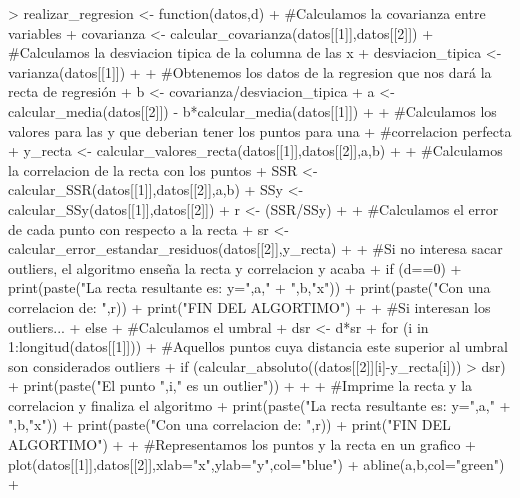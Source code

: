 \documentclass[parskip=full]{scrartcl}
\begin{document}
\begin{Schunk}
\begin{Sinput}
> realizar_regresion <- function(datos,d){
+ #Calculamos la covarianza entre variables
+ covarianza <- calcular_covarianza(datos[[1]],datos[[2]])
+ #Calculamos la desviacion tipica de la columna de las x
+ desviacion_tipica <- varianza(datos[[1]])
+ 
+ #Obtenemos los datos de la regresion que nos dará la recta de regresión
+ b <- covarianza/desviacion_tipica
+ a <- calcular_media(datos[[2]]) - b*calcular_media(datos[[1]])
+ 
+ #Calculamos los valores para las y que deberian tener los puntos para una 
+ #correlacion perfecta
+ y_recta <- calcular_valores_recta(datos[[1]],datos[[2]],a,b)
+ 
+ #Calculamos la correlacion de la recta con los puntos
+ SSR <- calcular_SSR(datos[[1]],datos[[2]],a,b)
+ SSy <- calcular_SSy(datos[[1]],datos[[2]])
+ r <- (SSR/SSy)
+ 
+ #Calculamos el error de cada punto con respecto a la recta
+ sr <- calcular_error_estandar_residuos(datos[[2]],y_recta)
+ 
+ #Si no interesa sacar outliers, el algoritmo enseña la recta y correlacion y acaba
+ if (d==0){
+ print(paste("La recta resultante es: y=",a," + ",b,"x"))
+ print(paste("Con una correlacion de: ",r))
+ print("FIN DEL ALGORTIMO")
+ }
+ #Si interesan los outliers...
+ else{
+ #Calculamos el umbral
+ dsr <- d*sr
+ for (i in 1:longitud(datos[[1]])){
+   #Aquellos puntos cuya distancia este superior al umbral son considerados outliers
+   if (calcular_absoluto((datos[[2]][i]-y_recta[i])) > dsr){
+     print(paste("El punto ",i," es un outlier"))
+   }
+ }
+ #Imprime la recta y la correlacion y finaliza el algoritmo
+ print(paste("La recta resultante es: y=",a," + ",b,"x"))
+ print(paste("Con una correlacion de: ",r))
+ print("FIN DEL ALGORTIMO")
+ }
+ #Representamos los puntos y la recta en un grafico
+ plot(datos[[1]],datos[[2]],xlab="x",ylab="y",col="blue")
+ abline(a,b,col="green")
+ }
\end{Sinput}
\end{Schunk}
\end{document}
